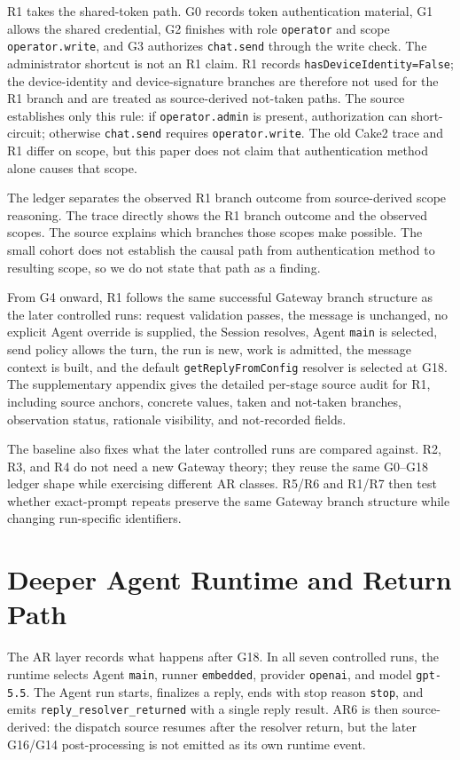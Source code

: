 \documentclass[11pt,a4paper]{article}
\begin{document}
R1 takes the shared-token path. G0 records token authentication material,
G1 allows the shared credential, G2 finishes with role \texttt{operator}
and scope \texttt{operator.write}, and G3 authorizes
\texttt{chat.send} through the write check. The administrator shortcut is
not an R1 claim. R1 records \texttt{hasDeviceIdentity=False}; the
device-identity and device-signature branches are therefore not used for
the R1 branch and are treated as source-derived not-taken paths. The
source establishes only this rule: if \texttt{operator.admin} is present,
authorization can short-circuit; otherwise \texttt{chat.send} requires
\texttt{operator.write}. The old Cake2 trace and R1 differ on scope, but
this paper does not claim that authentication method alone causes that
scope.

The ledger separates the observed R1 branch outcome from source-derived
scope reasoning. The trace directly shows the R1 branch outcome and the
observed scopes. The source explains which branches those scopes make
possible. The small cohort does not establish the causal path from
authentication method to resulting scope, so we do not state that path as
a finding.

From G4 onward, R1 follows the same successful Gateway branch structure
as the later controlled runs: request validation passes, the message is
unchanged, no explicit Agent override is supplied, the Session resolves,
Agent \texttt{main} is selected, send policy allows the turn, the run is
new, work is admitted, the message context is built, and the default
\texttt{getReplyFromConfig} resolver is selected at G18. The supplementary
appendix gives the detailed per-stage source audit for R1, including source
anchors, concrete values, taken and not-taken branches, observation status,
rationale visibility, and not-recorded fields.

The baseline also fixes what the later controlled runs are compared
against. R2, R3, and R4 do not need a new Gateway theory; they reuse the
same G0--G18 ledger shape while exercising different AR classes. R5/R6
and R1/R7 then test whether exact-prompt repeats preserve the same
Gateway branch structure while changing run-specific identifiers.

\section{Deeper Agent Runtime and Return Path}
\label{sec:ar-path}

The AR layer records what happens after G18. In all seven controlled
runs, the runtime selects Agent \texttt{main}, runner \texttt{embedded},
provider \texttt{openai}, and model \texttt{gpt-5.5}. The Agent run
starts, finalizes a reply, ends with stop reason \texttt{stop}, and emits
\texttt{reply\_resolver\_returned} with a single reply result. AR6 is
then source-derived: the dispatch source resumes after the resolver
return, but the later G16/G14 post-processing is not emitted as its own
runtime event.
\end{document}
